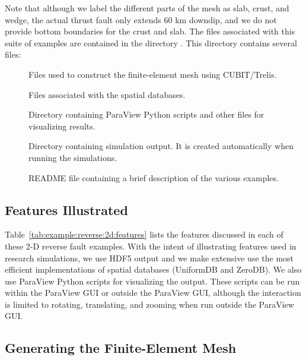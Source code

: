 Note that although we label the different parts of the mesh as slab,
crust, and wedge, the actual thrust fault only extends 60 km downdip,
and we do not provide bottom boundaries for the crust and slab.
The files associated with this suite of examples are contained in the
directory . This directory contains
several files:
\begin{description}
\item[] Files used to construct the finite-element mesh using
  CUBIT/Trelis.
\item[] Files associated with the spatial databases.
\item[] Directory containing ParaView
  Python scripts and other files for visualizing results.
\item[] Directory containing simulation
  output. It is created automatically when running the
  simulations.
\item[] README file containing a brief description
  of the various examples.
\end{description}


\subsection{Features Illustrated}

Table~\ref{tab:example:reverse:2d:features} lists the features
discussed in each of these 2-D reverse fault examples. With the
intent of illustrating features used in research simulations, we use
HDF5 output and we make extensive use the most efficient
implementations of spatial databases (UniformDB and ZeroDB). We
also use ParaView Python scripts for visualizing the output. These
scripts can be run within the ParaView GUI or outside the ParaView
GUI, although the interaction is limited to rotating, translating, and
zooming when run outside the ParaView GUI.

%   

\subsection{Generating the Finite-Element Mesh}

